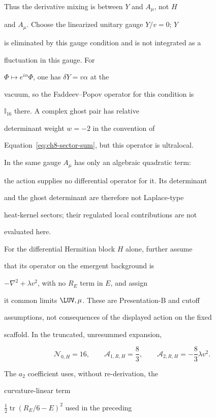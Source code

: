 Thus the derivative mixing is between \(Y\) and \(A_\mu\), not \(H\)

and \(A_\mu\). Choose the linearized unitary gauge \(Y/v=0\); \(Y\)

is eliminated by this gauge condition and is not integrated as a

fluctuation in this gauge. For

\(\Phi\mapsto e^{i\alpha}\Phi\), one has \(\delta Y=v\alpha\) at the

vacuum, so the Faddeev--Popov operator for this condition is

\(\mathbb I_{16}\) there. A complex ghost pair has relative

determinant weight \(w=-2\) in the convention of

Equation~\eqref{eq:ch8-sector-sum}, but this operator is ultralocal.

In the same gauge \(A_\mu\) has only an algebraic quadratic term:

the action supplies no differential operator for it. Its determinant

and the ghost determinant are therefore not Laplace-type

heat-kernel sectors; their regulated local contributions are not

evaluated here.



For the differential Hermitian block \(H\) alone, further assume

that its operator on the emergent background is

\(-\nabla^2+\lambda v^2\), with no \(R_E\) term in \(E\), and assign

it common limits \(\LUV,\mu\). These are Presentation-B and cutoff

assumptions, not consequences of the displayed action on the fixed

scaffold. In the truncated, unresummed expansion,

\[

  \mathcal N_{0,H}=16,\qquad

  \mathcal A_{1,R,H}=\frac83,\qquad

  \mathcal A_{2,R,H}=-\frac83\lambda v^2 .

\]

The \(a_2\) coefficient uses, without re-derivation, the

curvature-linear term

\(\tfrac12\operatorname{tr}(R_E/6-E)^2\) used in the preceding

